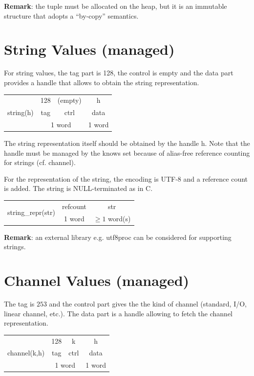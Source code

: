 \documentclass[a4paper,11pt]{article}
\newcommand{\code}[1]{\textsf{#1}}
\begin{document}
\textbf{Remark}: the tuple must be allocated on the heap, but it is an immutable structure that
 adopts a ``by-copy'' semantics.

\section{String Values (managed)}

For string values, the tag part is 128, the control is empty and the data
 part provides a handle that allows to obtain the string representation.

\begin{tabular}{|c|c|c|c|}
\hline
\multirow{3}{*}{\code{string(h)}} & 128 & (empty) & \code{h} \\
\cline{2-4}
 & \code{tag} & \code{ctrl} & \code{data} \\
\cline{2-4}
 & \multicolumn{2}{|c|}{1 word} & 1 word \\
\hline
\end{tabular}

The string representation itself should be obtained by the handle \code{h}.
Note that the handle must be managed by the \code{knows} set because of
 alias-free reference counting for strings (cf. channel).

For the representation of the string, the encoding is UTF-8 and a reference
count is added. The string is \code{NULL}-terminated as in C.

\begin{tabular}{|c|c|c|}
\hline
\multirow{3}{*}{\code{string\_repr(str)}} & \code{refcount} & \code{str} \\
\cline{2-3}
 & 1 word & $\geq 1$ word(s) \\
\hline
\end{tabular}

\textbf{Remark}: an external library e.g. \code{utf8proc} can be considered
for supporting strings.

\section{Channel Values (managed)}

The tag is $253$ and the control part gives the the
kind of channel  (standard, I/O, linear channel, etc.). The data part is a 
handle allowing to fetch the channel representation.

\begin{tabular}{|c|c|c|c|}
\hline
\multirow{3}{*}{\code{channel(k,h)}} & 128 & k & \code{h} \\
\cline{2-4}
 & \code{tag} & \code{ctrl} & \code{data} \\
\cline{2-4}
 & \multicolumn{2}{|c|}{1 word} & 1 word \\
\hline
\end{tabular}
\end{document}
